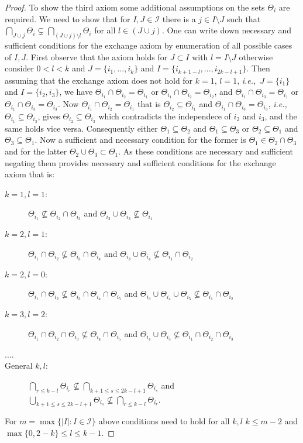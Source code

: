 \documentclass[a4paper,12pt]{article}
\newcommand{\ie}{{\em i.e.,}~}
\begin{document}
\begin{proof}
  To show the third axiom some additional assumptions on the sets
  $\Theta_i$ are required. We need to show that for $I,J \in
  \mathscr{I}$ there is a $j \in I \setminus J$ such that $\bigcap_{J
    \cup j}\Theta_i \subsetneq \bigcap_{(J\cup j)\setminus l}
  \Theta_i$ for all $l \in (J \cup j)$. One can write down necessary
  and sufficient conditions for the exchange axiom by enumeration of
  all possible cases of $I,J$. First observe that the axiom holds for
  $J \subset I$ with $l = I \setminus J$ otherwise consider $0 < l <
  k$ and $J = \{i_1,...,i_k\}$ and $I =
  \{i_{k+1-l},...,i_{2k-l+1}\}$. Then assuming that the exchange axiom
  does not hold for $k = 1$, $l = 1$, \ie $J = \{i_1\}$
  and $I =   \{i_2,i_3\}$, we have $\Theta_{i_1} \cap \Theta_{i_2} = \Theta_{i_1}$
  or $\Theta_{i_1} \cap \Theta_{i_2} = \Theta_{i_2}$, and $\Theta_{i_1} \cap
  \Theta_{i_3} = \Theta_{i_1}$ or $\Theta_{i_1} \cap \Theta_{i_3} = \Theta_{i_3}$. Now $\Theta_{i_1} \cap \Theta_{i_2} = \Theta_{i_1}$ that is
  $\Theta_{i_2} \subseteq \Theta_{i_1}$ and $\Theta_{i_1} \cap \Theta_{i_3} =
  \Theta_{i_3}$, \ie $\Theta_{i_1} \subseteq \Theta_{i_3}$, gives $\Theta_{i_2}
  \subseteq \Theta_{i_3}$ which contradicts the independece of $i_2$
  and $i_3$, and the same holds vice versa. Consequently either
  $\Theta_1 \subseteq \Theta_2$ and $\Theta_1 \subseteq \Theta_3$ or
  $\Theta_2 \subseteq \Theta_1$ and $\Theta_3 \subseteq \Theta_1$. Now
  a sufficient and necessary condition for the former is $\Theta_1 \in
  \Theta_2 \cap \Theta_3$ and for the latter $\Theta_2 \cup \Theta_3
  \subset \Theta_1$. As these conditions are necessary and sufficient
  negating them provides necessary and sufficient conditions for the
  exchange axiom that is:
  \begin{description}
  \item[$k=1,l=1$:] $\Theta_{i_1} \nsubseteq \Theta_{i_2} \cap
    \Theta_{i_3}$ and $\Theta_{i_2} \cup \Theta_{i_3} \nsubseteq \Theta_{i_1}$
  \item[$k=2,l=1$:] $\Theta_{i_1} \cap \Theta_{i_2} \nsubseteq
    \Theta_{i_3} \cap \Theta_{i_4}$ and $\Theta_{i_3} \cup \Theta_{i_4} \nsubseteq \Theta_{i_1} \cap \Theta_{i_2}$
  \item[$k=2,l=0$:] $\Theta_{i_1} \cap \Theta_{i_2} \nsubseteq
    \Theta_{i_3} \cap \Theta_{i_4} \cap \Theta_{i_5}$ and
    $\Theta_{i_3} \cup \Theta_{i_4} \cup \Theta_{i_5} \nsubseteq \Theta_{i_1} \cap \Theta_{i_2}$
  \item[$k=3,l=2$:] $\Theta_{i_1} \cap \Theta_{i_2} \cap \Theta_{i_3}\nsubseteq
    \Theta_{i_4} \cap \Theta_{i_5}$ and $\Theta_{i_4} \cup
    \Theta_{i_5} \nsubseteq \Theta_{i_1} \cap \Theta_{i_2} \cap \Theta_{i_3}$
  \item[....]
  \item[General $k,l$:] $\bigcap_{r \leq k-l} \Theta_{i_r} \nsubseteq
    \bigcap_{k+1 \leq s \leq 2k-l+1} \Theta_{i_s}$ and $\bigcup_{k+1
      \leq s \leq 2k-l+1} \Theta_{i_s} \nsubseteq \bigcap_{r \leq k-l} \Theta_{i_r}$.
  \end{description}
  For $m = \max \{|I|: I \in \mathscr{I}\}$ above conditions need to
  hold for all $k,l$ $k \leq m-2$ and $\max\{0,2-k\} \leq l \leq
  k-1$.
\end{proof}
\end{document}
